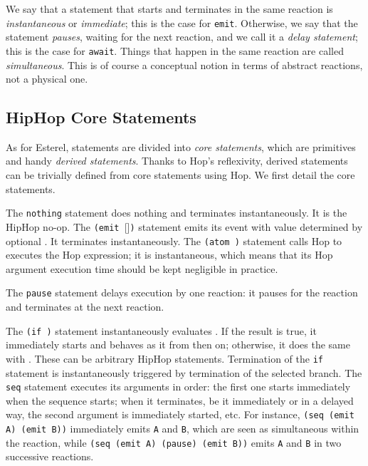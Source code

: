 \documentclass{llncs}
\begin{document}
We say that a statement that starts and terminates in the same
reaction is {\em{instantaneous}} or {\em{immediate}}; this is the case for
{\texttt{emit{}}}.  Otherwise, we say that the statement {\em{pauses}}, waiting
for the next reaction, and we call it a {\em{delay statement}}; this is
the case for {\texttt{await{}}}.  Things that happen in the same reaction are
called {\em{simultaneous}}. This is of course a conceptual notion in
terms of abstract reactions, not a physical one.


\subsection{HipHop Core Statements}
\label{HipHop core statements}

As for Esterel, statements are divided into {\em{core statements}},
which are primitives and handy {\em{derived statements}}. Thanks to
Hop's reflexivity, derived statements can be trivially defined from
core statements using Hop. We first detail the core statements.

The {\texttt{nothing{}}} statement does nothing and terminates
instantaneously. It is the HipHop no-op. 
The {\texttt{(emit{}  }}[]\texttt{)} statement emits its event  with value
determined by optional
. It terminates instantaneously.
The {\texttt{(atom{} )}} statement calls Hop to executes the  Hop
expression; it is instantaneous, which means that its Hop argument
execution time should be kept negligible in practice.

The {\texttt{pause{}}} statement delays execution by one reaction:
it pauses for the reaction and terminates at the next
reaction.

The {\texttt{(if{}   )}} statement instantaneously evaluates . If the
result is true, it immediately starts  and
behaves as it from then on; otherwise, it does the same with . These can be arbitrary 
HipHop statements. Termination of the {\texttt{if{}}} statement is
instantaneously triggered by termination of the selected branch.
The {\texttt{seq{}}} statement executes its arguments in order: the first
one starts immediately when the sequence starts; when it
terminates, be it immediately or in a delayed way, the second argument
is immediately started, etc. For instance, {\texttt{(seq{} (emit{} A) (emit{}
B))}} immediately emits {\texttt{A}} and {\texttt{B}}, which are seen as
simultaneous within the reaction, while {\texttt{(seq{} (emit{} A) (pause{})
(emit{} B))}} emits {\texttt{A}} and {\texttt{B}} in two successive reactions.
\end{document}
